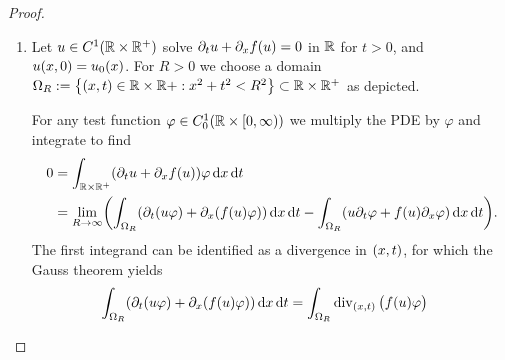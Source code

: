 \begin{proof}
	\begin{enumerate}
		\item Let \(u \in C^1\parentheses*{\R \times \R^+}\) solve \(\partial_t u + \partial_x f\parentheses*{u} = 0\) in \(\R\) for \(t > 0\), and \(u\parentheses*{x, 0} = u_0\parentheses*{x}\).
		For \(R > 0\) we choose a domain \(\Omega_R := \braces*{\parentheses*{x, t} \in \R \times \R + : x^2 + t^2 < R^2} \subset \R \times \R^+\) as depicted.
		\begin{center}
		\end{center}
		For any test function \(\varphi \in C_0^1\parentheses*{\R \times \left[0, \infty\right)}\) we multiply the PDE by \(\varphi\) and integrate to find
		\begin{align*}
			0 &= \int_{\R \times \R^+}\parentheses*{\partial_t u + \partial_x f\parentheses*{u}}\varphi\d x\d t\\
			&= \lim_{R \to \infty}\parentheses*{\int_{\Omega_R}\parentheses*{\partial_t\parentheses*{u\varphi} + \partial_x\parentheses*{f\parentheses*{u}\varphi}}\d x\d t - \int_{\Omega_R} \parentheses*{u\partial_t \varphi + f\parentheses*{u}\partial_x \varphi}\d x\d t}.
		\end{align*}
		The first integrand can be identified as a divergence in \(\parentheses*{x, t}\), for which the Gauss theorem yields
		\begin{align*}
			\int_{\Omega_R}\parentheses*{\partial_t \parentheses*{u\varphi} + \partial_x \parentheses*{f\parentheses*{u}\varphi}}\d x\d t &= \int_{\Omega_R}\div_{\parentheses*{x, t}}\begin{pmatrix}
				f\parentheses*{u}\varphi\\

\end{pmatrix}
\end{align*}
\end{enumerate}
\end{proof}
